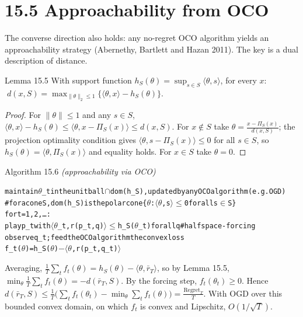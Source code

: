 \documentclass[11pt,a4paper,openany]{book}
\newcommand{\Reg}{\mathrm{Regret}}
\newcommand{\ip}[2]{\langle #1,#2\rangle}
\newcommand{\norm}[1]{\lVert #1\rVert}
\newenvironment{algo}{\par\smallskip\begingroup\footnotesize\begin{alltt}}{\end{alltt}\endgroup\smallskip}
\begin{document}
\section*{15.5 Approachability from OCO}\label{ch15-oco}

The converse direction also holds: any no-regret OCO algorithm yields an approachability strategy (Abernethy, Bartlett and Hazan 2011). The key is a dual description of distance.

\begin{bthm}{Lemma 15.5}
With support function $h_S(\theta)=\sup_{s\in S}\ip\theta s$, for every $x$: $\;d(x,S)=\max_{\norm\theta_2\le1}\big\{\ip\theta x-h_S(\theta)\big\}$.
\end{bthm}

\begin{proof}
For $\norm\theta\le1$ and any $s\in S$, $\ip{\theta}{x}-h_S(\theta)\le\ip\theta{x-\Pi_S(x)}\le d(x,S)$. For $x\notin S$ take $\theta=\frac{x-\Pi_S(x)}{d(x,S)}$; the projection optimality condition gives $\ip\theta{s-\Pi_S(x)}\le0$ for all $s\in S$, so $h_S(\theta)=\ip\theta{\Pi_S(x)}$ and equality holds. For $x\in S$ take $\theta=0$.
\end{proof}

\begin{balg}{Algorithm 15.6 \emph{(approachability via OCO)}}
\begin{algo}
maintain \ensuremath{\theta}\_t in the unit ball \ensuremath{\cap} dom(h\_S), updated by any OCO algorithm (e.g. OGD)
    \# for a cone S, dom(h\_S) is the polar cone \{\ensuremath{\theta} : \ensuremath{\langle}\ensuremath{\theta},s\ensuremath{\rangle} \ensuremath{\le} 0 for all s \ensuremath{\in} S\}
for t = 1, 2, …:
    play p\_t with \ensuremath{\langle}\ensuremath{\theta}\_t, r(p\_t, q)\ensuremath{\rangle} \ensuremath{\le} h\_S(\ensuremath{\theta}\_t) for all q     \# halfspace-forcing
    observe q\_t;  feed the OCO algorithm the convex loss
        f\_t(\ensuremath{\theta}) = h\_S(\ensuremath{\theta}) \ensuremath{-} \ensuremath{\langle}\ensuremath{\theta}, r(p\_t, q\_t)\ensuremath{\rangle}
\end{algo}
\end{balg}

Averaging, $\frac1T\sum_tf_t(\theta)=h_S(\theta)-\ip\theta{\bar r_T}$, so by Lemma 15.5, $\min_\theta\frac1T\sum_tf_t(\theta)=-d(\bar r_T,S)$. By the forcing step, $f_t(\theta_t)\ge0$. Hence $d(\bar r_T,S)\le\frac1T\big(\sum_tf_t(\theta_t)-\min_\theta\sum_tf_t(\theta)\big)=\frac{\Reg_T}{T}$. With OGD over this bounded convex domain, on which $f_t$ is convex and Lipschitz, $O(1/\sqrt T)$.
\end{document}
